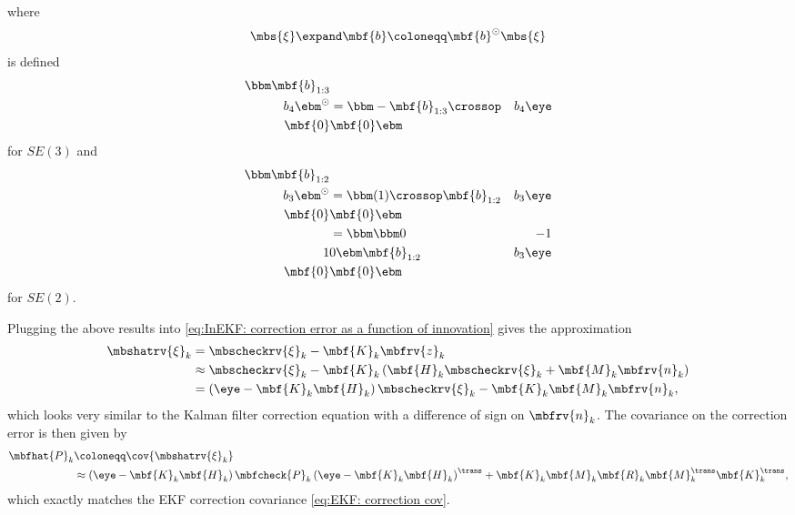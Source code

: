 \documentclass[nobib, nofonts, notoc, justified]{tufte-handout}
\begin{document}
  where 
  \begin{align}
    \mbs{\xi}\expand\mbf{b} \coloneqq \mbf{b}^{\odot}\mbs{\xi}\\
  \end{align}
  is defined 
  \begin{align}
    \bbm
      \mbf{b}_{1:3}\\
      b_{4}
    \ebm^{\odot}
    &=
    \bbm
      -\mbf{b}_{1:3}\crossop & b_{4}\eye \\ \mbf{0} & \mbf{0}
    \ebm
  \end{align}
  for $SE(3)$ and 
  \begin{align}
    \bbm
      \mbf{b}_{1:2}\\
      b_{3}
    \ebm^{\odot}
    &=
    \bbm
      (1)\crossop\mbf{b}_{1:2} & b_{3}\eye \\ \mbf{0} & \mbf{0}
    \ebm\\
    &=
    \bbm
      \bbm 0 & -1\\1 & 0 \ebm\mbf{b}_{1:2} & b_{3}\eye \\ \mbf{0} & \mbf{0}
    \ebm
  \end{align}
  for $SE(2)$.
  
  Plugging the above results into \eqref{eq:InEKF: correction error as a function of innovation} gives the approximation
  \begin{align}
    \mbshatrv{\xi}_{k} &= 
    \mbscheckrv{\xi}_{k} - \mbf{K}_{k}\mbfrv{z}_{k}\\
    &\approx
    \mbscheckrv{\xi}_{k} - \mbf{K}_{k}\left( \mbf{H}_{k}\mbscheckrv{\xi}_{k} + \mbf{M}_{k}\mbfrv{n}_{k} \right)\\
    &= \left( \eye - \mbf{K}_{k}\mbf{H}_{k} \right)\mbscheckrv{\xi}_{k} - \mbf{K}_{k}\mbf{M}_{k}\mbfrv{n}_{k},
  \end{align}
  which looks very similar to the Kalman filter correction equation with a difference of sign on $\mbfrv{n}_{k}$. The covariance on the correction error is then given by
  \begin{align}
    \mbfhat{P}_{k} &\coloneqq \cov{\mbshatrv{\xi}_{k}}\\
    &\approx \left( \eye - \mbf{K}_{k}\mbf{H}_{k} \right)\mbfcheck{P}_{k}\left( \eye - \mbf{K}_{k}\mbf{H}_{k} \right)^{\trans} + \mbf{K}_{k}\mbf{M}_{k}\mbf{R}_{k}\mbf{M}_{k}^{\trans}\mbf{K}_{k}^{\trans},
  \end{align}
  which exactly matches the EKF correction covariance \eqref{eq:EKF: correction cov}.
\end{document}
